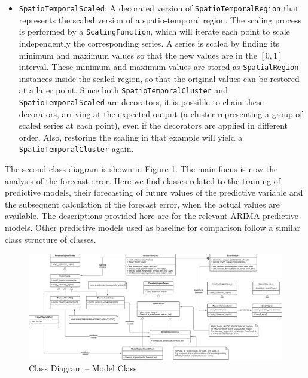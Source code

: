 \begin{itemize}
	\item \texttt{SpatioTemporalScaled}: A decorated version of \texttt{SpatioTemporalRegion} that represents the scaled version of a spatio-temporal region. The scaling process is performed by a \texttt{ScalingFunction}, which will iterate each point to scale independently the corresponding series. A series is scaled by finding its minimum and maximum values so that the new values are in the $[0, 1]$ interval. These minimum and maximum values are stored as \texttt{SpatialRegion} instances inside the scaled region, so that the original values can be restored at a later point. Since both \texttt{SpatioTemporalCluster} and \texttt{SpatioTemporalScaled} are decorators, it is possible to chain these decorators, arriving at the expected output (a cluster representing a group of scaled series at each point), even if the decorators are applied in different order. Also, restoring the scaling in that example will yield a \texttt{SpatioTemporalCluster} again.
\end{itemize}

The second class diagram is shown in Figure \ref{Fig:DiagramClasess-Models}. %
The main focus is now the analysis of the forecast error. Here we find classes related to the training of predictive models, their forecasting of future values of the predictive variable and the subsequent calculation of the forecast error, when the actual values are available. The descriptions provided here are for the relevant ARIMA predictive models. Other predictive models used as baseline for comparison follow a similar class structure of classes.

\begin{figure}[tp]
	\centering
	\includegraphics[scale=0.36, angle=90]{../Figures/SPT-TSA-ModelsClasses}
	\caption{Class Diagram -- Model Class.}	
	\label{Fig:DiagramClasess-Models}	 		
\end{figure}

